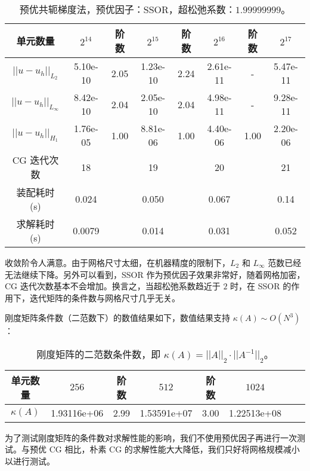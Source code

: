 \documentclass[lang=cn,11pt,a4paper]{elegantpaper}
\begin{document}
\begin{table}[H]
    \centering
    \begin{tabular}{|c|c|c|c|c|c|c|c|}
    \hline
    单元数量                    & $2^{14}$ & 阶数 & $2^{15}$ & 阶数 & $2^{16}$ & 阶数 & $2^{17}$ \\ \hline
    $||u-u_h||_{L_2}$      & 5.10e-10     & 2.05 & 1.23e-10     & 2.24 & 2.61e-11     & - & 5.47e-11     \\ \hline
    $||u-u_h||_{L_\infty}$ & 8.42e-10     & 2.04 & 2.05e-10     & 2.04 & 4.98e-11     & - & 9.28e-11     \\ \hline
    $||u-u_h||_{H_1}$      & 1.76e-05     & 1.00 & 8.81e-06     & 1.00 & 4.40e-06     & 1.00 & 2.20e-06     \\ \hline
    CG 迭代次数            & 18 & & 19 & & 20 & & 21\\    
\hline
    装配耗时 (s)           & 0.024         &      & 0.050          &      & 0.067           &      & 0.14     \\ \hline
    求解耗时 (s)           & 0.0079         &      & 0.014          &      & 0.031           &      & 0.052     \\ \hline
    \end{tabular}
    \caption{\small 预优共轭梯度法，预优因子：SSOR，超松弛系数：$1.99999999$。}
\end{table}

收敛阶令人满意。由于网格尺寸太细，在机器精度的限制下，$L_2$ 和 $L_\infty$ 范数已经无法继续下降。另外可以看到，SSOR 作为预优因子效果非常好，随着网格加密，CG 迭代次数基本不会增加。换言之，当超松弛系数趋近于 $2$ 时，在 SSOR 的作用下，迭代矩阵的条件数与网格尺寸几乎无关。

刚度矩阵条件数（二范数下）的数值结果如下，数值结果支持 $\kappa(A)\sim O(N^3)$：

\begin{table}[H]
    \centering
    \begin{tabular}{|c|c|c|c|c|c|c|c|}
    \hline
    单元数量                    & $256$ & 阶数 & $512$ & 阶数 & $1024$ \\ \hline
  $\kappa(A)$            & 1.93116e+06 & 2.99 & 1.53591e+07 & 3.00 & 1.22513e+08\\    \hline
    \end{tabular}
    \caption{\small 刚度矩阵的二范数条件数，即 $\kappa(A)=||A||_2\cdot ||A^{-1}||_2$。}
\end{table}

为了测试刚度矩阵的条件数对求解性能的影响，我们不使用预优因子再进行一次测试。与预优 CG 相比，朴素 CG 的求解性能大大降低，我们只好将网格规模减小以进行测试。
\end{document}

